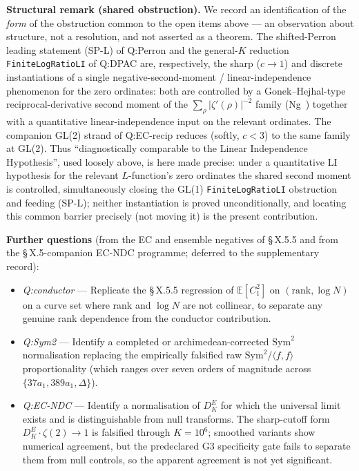 \textbf{Structural remark (shared obstruction).} We record an
identification of the \emph{form} of the obstruction common to the open
items above --- an observation about structure, not a resolution,
and not asserted as a theorem. The shifted-Perron leading
statement (SP-L) of Q:Perron and the general-\(K\) reduction
\texttt{FiniteLogRatioLI} of Q:DPAC are, respectively, the sharp
(\(c \to 1\)) and discrete instantiations of a single
negative-second-moment / linear-independence phenomenon for the
zero ordinates: both are controlled by a Gonek--Hejhal-type
reciprocal-derivative second moment of the
\(\sum_{\rho} |\zeta'(\rho)|^{-2}\) family (Ng~\cite{Ng2004}) together with a
quantitative linear-independence input on the relevant ordinates.
The companion GL(2) strand of Q:EC-recip reduces (softly, \(c < 3\))
to the same family at GL(2). Thus ``diagnostically comparable to
the Linear Independence Hypothesis'', used loosely above, is here
made precise: under a quantitative LI hypothesis for the relevant
\(L\)-function's zero ordinates the shared second moment is
controlled, simultaneously closing the GL(1) \texttt{FiniteLogRatioLI}
obstruction and feeding (SP-L); neither instantiation is proved
unconditionally, and locating this common barrier precisely (not
moving it) is the present contribution.

\textbf{Further questions} (from the EC and ensemble negatives of \S\,X.5.5
and from the \S\,X.5-companion EC-NDC programme; deferred to the
supplementary record):

\begin{itemize}
\item
  \emph{Q:conductor} --- Replicate the \S\,X.5.5 regression of
  \(\mathbb{E}[C_1^2]\) on \((\mathrm{rank}, \log N)\) on a curve set
  where rank and \(\log N\) are not collinear, to separate any
  genuine rank dependence from the conductor contribution.
\item
  \emph{Q:Sym2} --- Identify a completed or archimedean-corrected
  \(\mathrm{Sym}^2\) normalisation replacing the empirically falsified
  raw \(\mathrm{Sym}^2 / \langle f, f \rangle\) proportionality (which
  ranges over seven orders of magnitude across
  \(\{37a_1, 389a_1, \Delta\}\)).
\item
  \emph{Q:EC-NDC} --- Identify a normalisation of \(D_K^E\) for which the
  universal limit exists and is distinguishable from null
  transforms. The sharp-cutoff form \(D_K^E \cdot \zeta(2) \to 1\) is
  falsified through \(K = 10^{6}\); smoothed variants show numerical
  agreement, but the predeclared G3 specificity gate fails to
  separate them from null controls, so the apparent agreement is
  not yet significant.
\end{itemize}


